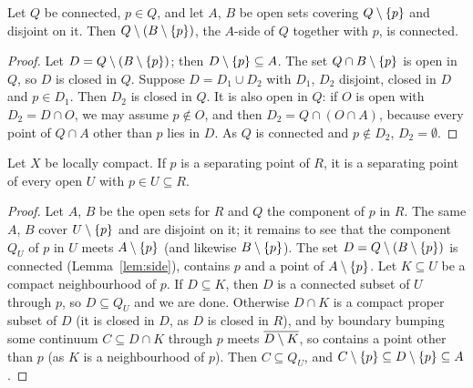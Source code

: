 
\begin{lemma}\label{lem:side}
Let $Q$ be connected, $p\in Q$, and let $A$, $B$ be open sets covering $Q\setminus\left\{ p \right\}$ and disjoint on it. Then
$Q\setminus(B\setminus\left\{ p \right\})$, the $A$-side of $Q$ together with $p$, is connected.
\end{lemma}

\begin{proof}
Let $D=Q\setminus(B\setminus\left\{ p \right\})$; then $D\setminus\left\{ p \right\}\subseteq A$. The set $Q\cap B\setminus\left\{ p \right\}$ is open in $Q$, so $D$ is closed in $Q$.
Suppose $D=D_1\cup D_2$ with $D_1$, $D_2$ disjoint, closed in $D$ and $p\in D_1$. Then $D_2$ is closed in $Q$. It is also open in $Q$: if $O$ is
open with $D_2=D\cap O$, we may assume $p\notin O$, and then $D_2=Q\cap(O\cap A)$, because every point of $Q\cap A$ other than $p$ lies in $D$. As $Q$ is
connected and $p\notin D_2$, $D_2=\emptyset$.
\end{proof}


\begin{proposition}[Whyburn (9.1)]\label{prop:whyburn91}
Let $X$ be locally compact. If $p$ is a separating point of $R$, it is a separating point of every open $U$ with $p\in U\subseteq R$.
\end{proposition}

\begin{proof}
Let $A$, $B$ be the open sets for $R$ and $Q$ the component of $p$ in $R$. The same $A$, $B$ cover $U\setminus\left\{ p \right\}$ and are disjoint on it;
it remains to see that the component $Q_U$ of $p$ in $U$ meets $A\setminus\left\{ p \right\}$ (and likewise $B\setminus\left\{ p \right\}$). The set $D=Q\setminus(B\setminus\left\{ p \right\})$ is
connected (Lemma~\ref{lem:side}), contains $p$ and a point of $A\setminus\left\{ p \right\}$. Let $K\subseteq U$ be a compact neighbourhood of $p$. If $D\subseteq K$, then $D$ is
a connected subset of $U$ through $p$, so $D\subseteq Q_U$ and we are done. Otherwise $D\cap K$ is a compact proper subset of $D$ (it is closed in $D$,
as $D$ is closed in $R$), and by boundary bumping some continuum $C\subseteq D\cap K$ through $p$ meets $\overline{D\setminus K}$, so contains a point other than
$p$ (as $K$ is a neighbourhood of $p$). Then $C\subseteq Q_U$, and $C\setminus\left\{ p \right\}\subseteq D\setminus\left\{ p \right\}\subseteq A$.
\end{proof}

